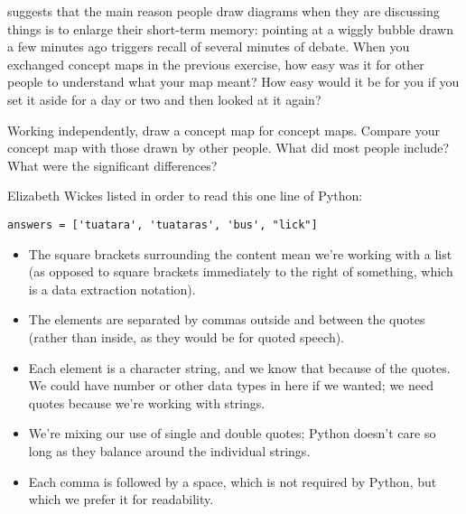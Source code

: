 
\cite{Cher2007} suggests that
the main reason people draw diagrams when they are discussing things
is to enlarge their short-term memory:
pointing at a wiggly bubble drawn a few minutes ago triggers recall of several minutes of debate.
When you exchanged concept maps in the previous exercise,
how easy was it for other people to understand what your map meant?
How easy would it be for you if you set it aside for a day or two and then looked at it again?


Working independently,
draw a concept map for concept maps.
Compare your concept map with those drawn by other people.
What did most people include?
What were the significant differences?


Elizabeth Wickes listed
in order to read this one line of Python:

\begin{verbatim}
answers = ['tuatara', 'tuataras', 'bus', "lick"]
\end{verbatim}

\begin{itemize}

\item
  The square brackets surrounding the content mean we're working with a list
  (as opposed to square brackets immediately to the right of something,
  which is a data extraction notation).

\item
  The elements are separated by commas outside and between the quotes
  (rather than inside, as they would be for quoted speech).

\item
  Each element is a character string,
  and we know that because of the quotes.
  We could have number or other data types in here if we wanted;
  we need quotes because we're working with strings.

\item
  We're mixing our use of single and double quotes;
  Python doesn't care so long as they balance around the individual strings.

\item
  Each comma is followed by a space,
  which is not required by Python,
  but which we prefer it for readability.

\end{itemize}

